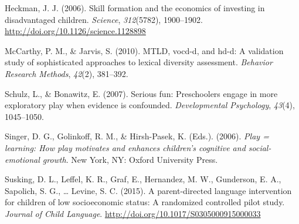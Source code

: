 \documentclass[10pt, letterpaper]{article}
\begin{document}
\hypertarget{ref-Heckman2006}{}
Heckman, J. J. (2006). Skill formation and the economics of investing in
disadvantaged children. \emph{Science}, \emph{312}(5782), 1900--1902.
\url{http://doi.org/10.1126/science.1128898}

\hypertarget{ref-McCarthy2010}{}
McCarthy, P. M., \& Jarvis, S. (2010). MTLD, vocd-d, and hd-d: A
validation study of sophisticated approaches to lexical diversity
assessment. \emph{Behavior Research Methods}, \emph{42}(2), 381--392.

\hypertarget{ref-Schulz2007}{}
Schulz, L., \& Bonawitz, E. (2007). Serious fun: Preschoolers engage in
more exploratory play when evidence is confounded. \emph{Developmental
Psychology}, \emph{43}(4), 1045--1050.

\hypertarget{ref-Singer2006}{}
Singer, D. G., Golinkoff, R. M., \& Hirsh-Pasek, K. (Eds.). (2006).
\emph{Play = learning: How play motivates and enhances children's
cognitive and social-emotional growth}. New York, NY: Oxford University
Press.

\hypertarget{ref-Suskind2015}{}
Susking, D. L., Leffel, K. R., Graf, E., Hernandez, M. W., Gunderson, E.
A., Sapolich, S. G., \ldots{} Levine, S. C. (2015). A parent-directed
language intervention for children of low socioeconomic status: A
randomized controlled pilot study. \emph{Journal of Child Language}.
\url{http://doi.org/10.1017/S0305000915000033}


\end{document}
